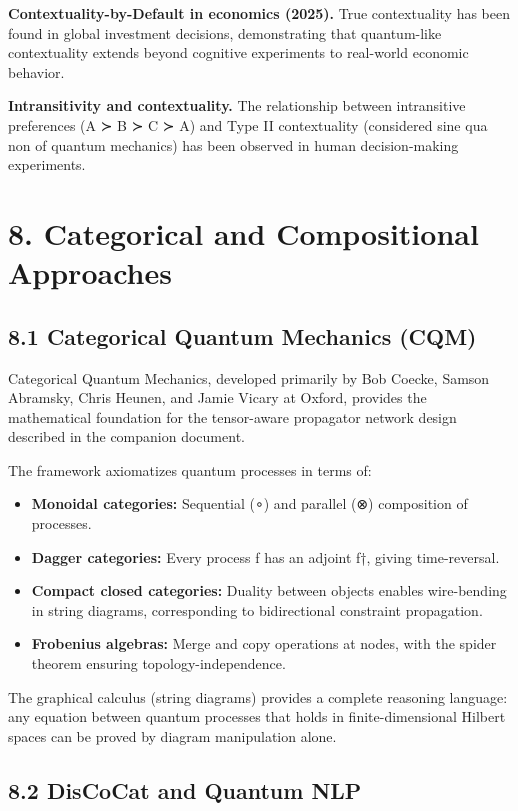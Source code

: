 \documentclass[11pt]{article}
\begin{document}
\textbf{Contextuality-by-Default in economics (2025).} True contextuality has been found
in global investment decisions, demonstrating that quantum-like contextuality
extends beyond cognitive experiments to real-world economic behavior.

\textbf{Intransitivity and contextuality.} The relationship between intransitive
preferences (A ≻ B ≻ C ≻ A) and Type II contextuality (considered sine qua non
of quantum mechanics) has been observed in human decision-making experiments.
\section{8. Categorical and Compositional Approaches}
\label{sec:orgb585e33}

\subsection{8.1 Categorical Quantum Mechanics (CQM)}
\label{sec:org1ac5c23}

Categorical Quantum Mechanics, developed primarily by Bob Coecke, Samson Abramsky,
Chris Heunen, and Jamie Vicary at Oxford, provides the mathematical foundation
for the tensor-aware propagator network design described in the companion document.

The framework axiomatizes quantum processes in terms of:
\begin{itemize}
\item \textbf{Monoidal categories:} Sequential (∘) and parallel (⊗) composition of processes.
\item \textbf{Dagger categories:} Every process f has an adjoint f†, giving time-reversal.
\item \textbf{Compact closed categories:} Duality between objects enables wire-bending in
string diagrams, corresponding to bidirectional constraint propagation.
\item \textbf{Frobenius algebras:} Merge and copy operations at nodes, with the spider theorem
ensuring topology-independence.
\end{itemize}

The graphical calculus (string diagrams) provides a complete reasoning language:
any equation between quantum processes that holds in finite-dimensional Hilbert
spaces can be proved by diagram manipulation alone.
\subsection{8.2 DisCoCat and Quantum NLP}
\label{sec:org5ef3d65}
\end{document}
